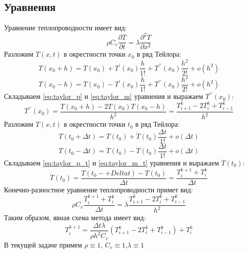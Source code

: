 \documentclass[a4paper]{article}
\begin{document}
    \subsection{Уравнения}
    Уравнение теплопроводности имеет вид:
    \begin{equation}\label{eq:parabol_eq}
        \rho C_v \frac{\partial T}{\partial t}=\lambda \frac{\partial^{2} T}{\partial x^{2}}
    \end{equation}
    Разложим $T(x,t)$ в окрестности точки $x_0$ в ряд Тейлора:
    \begin{equation}\label{eq:taylor_p}
        T(x_0+h)=T(x_0)+T^{\prime}(x_0) \frac{h}{1!}+T^{\prime \prime}(x_0) \frac{h^{2}}{2!}+o(h^2)
    \end{equation}
    \begin{equation}\label{eq:taylor_m} 
        T(x_0-h)=T(x_0)-T^{\prime}(x_0) \frac{h}{1!}+T^{\prime \prime}(x_0) \frac{h^{2}}{2!}+o(h^2)
    \end{equation}
    Складываем \ref{eq:taylor_p} и \ref{eq:taylor_m} уравнения и выражаем $ T^{\prime \prime}(x_0) $:
    \begin{equation}\label{eq:taylor_sym} 
        T^{\prime \prime}(x_0)=\frac{T(x_0+h)-2 T(x_0) T(x_0-h)}{h^2}=\frac{T^{k}_{i+1}-2 T^{k}_{i}+T^{k}_{i-1}}{h^2}
    \end{equation}
    Разложим $T(x,t)$ в окрестности точки $t_0$ в ряд Тейлора:
    \begin{equation}\label{eq:taylor_p_t} 
        T(t_0+\Delta t)=T(t_0)+\dot{T}(t_0) \frac{\Delta t}{1!}+o(\Delta t)
    \end{equation}
    \begin{equation}\label{eq:taylor_m_t} 
        T(t_0-\Delta t)=T(t_0)-\dot{T}(t_0) \frac{\Delta t}{1!}+o(\Delta t)
    \end{equation}
    Складываем \ref{eq:taylor_p_t} и \ref{eq:taylor_m_t} уравнения и выражаем $ \dot{T}(t_0) $:
    \begin{equation}\label{eq:taylor_sym_t} 
        \dot{T}(t_0)=\frac{T(t_0-+Delta t)-T(t_0)}{\Delta t}=\frac{T^{k+1}_{i}+T^{k}_{i}}{\Delta t}
    \end{equation}
    Конечно-разностное уравнение теплопроводности примет вид:
    \begin{equation}\label{eq:mkr} 
    \rho C_v \frac{T^{k+1}_{i}+T^{k}_{i}}{\Delta t} = \lambda \frac{T^{k}_{i+1}-2 T^{k}_{i}+T^{k}_{i-1}}{h^2}
    \end{equation}
    Таким образом, явная схема метода имеет вид:
    \begin{equation}\label{eq:explicit_schema} 
        T^{k+1}_{i}=\frac{\Delta t \lambda}{\rho h^2 C_v}(T^{k}_{i+1}-2 T^{k}_{i}+T^{k}_{i-1})+T^{k}_{i}
    \end{equation}
    В текущей задаче примем $\rho \equiv 1$, $C_v \equiv 1$,$\lambda \equiv 1$
    \newpage
\end{document}
